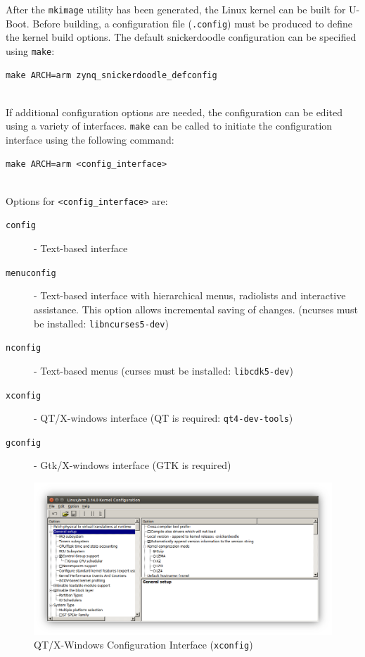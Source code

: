 After the \texttt{mkimage} utility has been generated, the Linux kernel can be built for U-Boot. Before building, a configuration file (\texttt{.config}) must be produced to define the kernel build options. The default snickerdoodle configuration can be specified using \texttt{make}: \\

\begin{lstlisting}[style=text]
make ARCH=arm zynq_snickerdoodle_defconfig
\end{lstlisting}

~\\
\noindent
If additional configuration options are needed, the configuration can be edited using a variety of interfaces. \texttt{make} can be called to initiate the configuration interface using the following command: \\

\begin{lstlisting}[style=text]
make ARCH=arm <config_interface>
\end{lstlisting}

~\\
\noindent
Options for \texttt{<config\_interface>} are:




\begin{description}
	\item[\texttt{config}] - Text-based interface
	\item[\texttt{menuconfig}] - Text-based interface with hierarchical menus, radiolists and interactive assistance. This option allows incremental saving of changes. (ncurses must be installed: \texttt{libncurses5-dev})
	\item[\texttt{nconfig}] - Text-based menus (curses must be installed: \texttt{libcdk5-dev})
	\item[\texttt{xconfig}] - QT/X-windows interface (QT is required: \texttt{qt4-dev-tools})
	\item[\texttt{gconfig}] - Gtk/X-windows interface (GTK is required)
\end{description}


\begin{figure}
	\centering
	\includegraphics{images/xconfig.png}
	\caption{QT/X-Windows Configuration Interface (\texttt{xconfig})}
	\label{fig:xconfig}
\end{figure}


